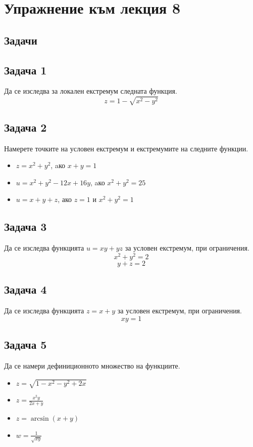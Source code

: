 \documentclass[a4paper,fleqn,12pt]{article}
\theoremstyle{definition}
\begin{document}
\newpage
\section{Упражнение към лекция 8}
\subsection{Задачи}

\subsection*{Задача 1}
Да се изследва за локален екстремум следната функция.
$$z = 1-\sqrt{x^2-y^2}$$

\subsection*{Задача 2}
Намерете точките на условен екстремум и екстремумите на следните функции.
\begin{itemize}
\item $z = x^2 + y^2$, aко $x+y=1$
\item $u = x^2 + y^2 - 12x + 16y$, aко $x^2+y^2=25$
\item $u = x + y + z$, ако $z = 1$ и $x^2 + y^2 = 1$
\end{itemize}

\subsection*{Задача 3}
Да се изследва функцията $u = xy + yz$ за условен екстремум, при ограничения.
$$x^2+y^2 = 2$$
$$y+z = 2$$

\subsection*{Задача 4}
Да се изследва функцията $z = x+y$ за условен екстремум, при ограничения.
$$xy = 1$$

\subsection*{Задача 5}
Да се намери дефиниционното множество на функциите.
\begin{itemize}
\item $z = \sqrt{1 - x^2 - y^2 + 2x}$
\item $z = \frac{x^2y}{2x+y}$
\item $z = \arcsin{(x+y)}$
\item $w = \frac{1}{\sqrt{xy}}$
\end{itemize}
\end{document}
